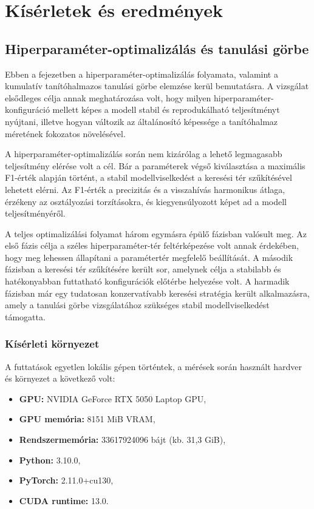 \chapter{Kísérletek és eredmények}

\section{Hiperparaméter-optimalizálás és tanulási görbe}

Ebben a fejezetben a hiperparaméter-optimalizálás folyamata, valamint a kumulatív tanítóhalmazos tanulási görbe elemzése kerül bemutatásra.
A vizsgálat elsődleges célja annak meghatározása volt, hogy milyen hiperparaméter-konfiguráció mellett képes a modell stabil és reprodukálható teljesítményt nyújtani, illetve hogyan változik az általánosító képessége a tanítóhalmaz méretének fokozatos növelésével.

A hiperparaméter-optimalizálás során nem kizárólag a lehető legmagasabb teljesítmény elérése volt a cél. Bár a paraméterek végső kiválasztása a maximális F1-érték alapján történt, a stabil modellviselkedést a keresési tér szűkítésével lehetett elérni.
Az F1-érték a precizitás és a visszahívás harmonikus átlaga, érzékeny az osztályozási torzításokra, és kiegyensúlyozott képet ad a modell teljesítményéről.

A teljes optimalizálási folyamat három egymásra épülő fázisban valósult meg.
Az első fázis célja a széles hiperparaméter-tér feltérképezése volt annak érdekében, hogy meg lehessen állapítani a paramétertér megfelelő beállítását.
A második fázisban a keresési tér szűkítésére került sor, amelynek célja a stabilabb és hatékonyabban futtatható konfigurációk előtérbe helyezése volt.
A harmadik fázisban már egy tudatosan konzervatívabb keresési stratégia került alkalmazásra, amely a tanulási görbe vizsgálatához szükséges stabil modellviselkedést támogatta.

\subsection{Kísérleti környezet}

A futtatások egyetlen lokális gépen történtek, a mérések során használt hardver és környezet a következő volt:
\begin{itemize}
    \item \textbf{GPU:} NVIDIA GeForce RTX 5050 Laptop GPU,
    \item \textbf{GPU memória:} 8151 MiB VRAM,
    \item \textbf{Rendszermemória:} 33617924096 bájt (kb. 31,3 GiB),
    \item \textbf{Python:} 3.10.0,
    \item \textbf{PyTorch:} 2.11.0+cu130,
    \item \textbf{CUDA runtime:} 13.0.
\end{itemize}

